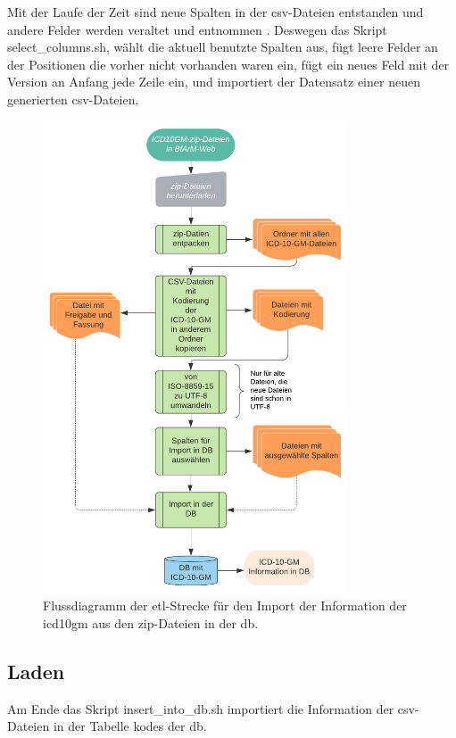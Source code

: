 Mit der Laufe der Zeit sind neue Spalten in der \ac{csv}-Dateien entstanden und andere Felder werden veraltet und entnommen \cite{readme13, readme17}. Deswegen das Skript \textsf{select\_columns.sh}, wählt die aktuell benutzte Spalten aus, fügt leere Felder an der Positionen die vorher nicht vorhanden waren ein, fügt ein neues Feld mit der Version an Anfang jede Zeile ein, und importiert der Datensatz einer neuen generierten \ac{csv}-Dateien.
\begin{figure}[ht]
	\centering
	\includegraphics[height=14cm]{figures/etl}
	\caption[\acs{etl}-Strecke]{Flussdiagramm der \acs{etl}-Strecke für den Import der Information der \ac{icd10gm} aus den \ac{zip}-Dateien in der \ac{db}.}
	\label{fig:etl}
\end{figure} 

\subsection{Laden}

Am Ende das Skript \textsf{insert\_into\_db.sh} importiert die Information der \ac{csv}-Dateien in der Tabelle \textsf{kodes} der \ac{db}.
 
	